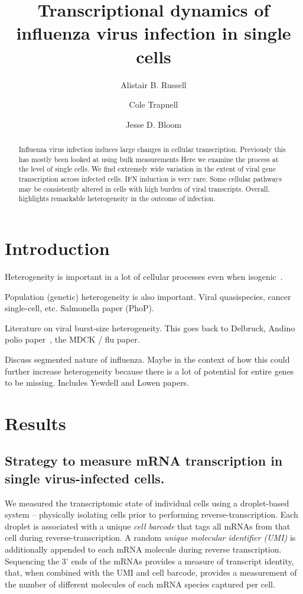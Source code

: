 \documentclass[9pt,lineno]{elife}
\title{Transcriptional dynamics of influenza virus infection in single cells}
\author[1]{Alistair B. Russell}
\author[2]{Cole Trapnell}
\author[1,2*]{Jesse D. Bloom}
\affil[1]{Basic Sciences Division and Computational Biology Program, Fred Hutchinson Cancer Research Center, Seattle, United States}
\affil[2]{Department of Genome Sciences, University of Washington, Seattle, United States}
\begin{document}
\maketitle

\begin{abstract}
Influenza virus infection induces large changes in cellular transcription.
Previously this has mostly been looked at using bulk measurements
Here we examine the process at the level of single cells.
We find extremely wide variation in the extent of viral gene transcription across infected cells.
IFN induction is very rare.
Some cellular pathways may be consistently altered in cells with high burden of viral transcripts.
Overall, highlights remarkable heterogeneity in the outcome of infection.
\end{abstract}


\section{Introduction}

Heterogeneity is important in a lot of cellular processes even when isogenic~\citep{shalek2013single,shalek2014single}.

Population (genetic) heterogeneity is also important. 
Viral quasispecies, cancer single-cell, etc.
Salmonella paper (PhoP).

Literature on viral burst-size heterogeneity.
This goes back to Delbruck, Andino polio paper~\citep{schulte2014single}, the MDCK / flu paper.

Discuss segmented nature of influenza.
Maybe in the context of how this could further increase heterogeneity because there is a lot of potential for entire genes to be missing.
Includes Yewdell and Lowen papers.

\section{Results}

\subsection{Strategy to measure mRNA transcription in single virus-infected cells.}
We measured the transcriptomic state of individual cells using a droplet-based system -- physically isolating cells prior to performing reverse-transcription.
Each droplet is associated with a unique \emph{cell barcode} that tags all mRNAs from that cell during reverse-transcription.
A random \emph{unique molecular identifier (UMI)} is additionally appended to each mRNA molecule during reverse transcription.
Sequencing the 3' ends of the mRNAs provides a measure of transcript identity, that, when combined with the UMI and cell barcode, provides a measurement of the number of different molecules of each mRNA species captured per cell.
\end{document}
